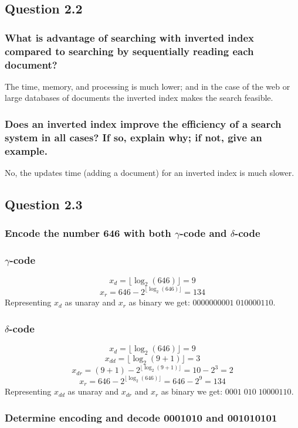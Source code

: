 \subsection*{Question 2.2}
\subsubsection*{What is advantage of searching with inverted index compared to searching by sequentially reading each document?}
The time, memory, and processing is much lower; and in the case of the web or large databases of documents the inverted index makes the search feasible.

\subsubsection*{Does an inverted index improve the efficiency of a search system in all cases? If so, explain why; if not, give an example.}
No, the updates time (adding a document) for an inverted index is much slower.

\subsection*{Question 2.3}
\subsubsection*{Encode the number 646 with both $\gamma$-code and $\delta$-code}
\subsubsection*{$\gamma$-code}
$$
x_d = \lfloor\log_2(646)\rfloor = 9
$$
$$
x_r = 646 - 2^{\lfloor\log_2(646)\rfloor} = 134
$$
Representing $x_d$ as unaray and $x_r$ as binary we get: $0000000001\;010000110$.
\subsubsection*{$\delta$-code}
$$
x_d = \lfloor\log_2(646)\rfloor = 9
$$
$$
x_{dd} = \lfloor\log_2(9 + 1)\rfloor = 3
$$
$$
x_{dr} = (9 + 1) - 2^{\lfloor\log_2(9 + 1)\rfloor} = 10 - 2^3 = 2
$$
$$
x_{r} = 646 - 2^{\lfloor\log_2(646)\rfloor} = 646 - 2^9 = 134
$$
Representing $x_{dd}$ as unaray and $x_{dr}$ and $x_r$ as binary we get: $0001 \; 010 \; 10000110$.

\subsubsection*{Determine encoding and decode $\textbf{0001010}$ and $\textbf{001010101}$}
